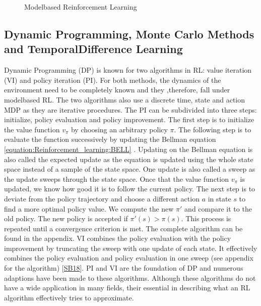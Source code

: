 \documentclass[letterpaper,10pt,english]{jupyterBook}
\let\sphinxpxdimen\pdfpxdimen\else\newdimen\sphinxpxdimen
\begin{document}
\begin{figure}[htbp]
\centering
\capstart

\noindent\sphinxincludegraphics[width=400\sphinxpxdimen,height=300\sphinxpxdimen]{{model_based_RL}.png}
\caption{Model\sphinxhyphen{}based Reinforcement Learning}\label{\detokenize{Reinforcement_learning:model-based-rl}}\end{figure}


\subsection{Dynamic Programming, Monte Carlo Methods and Temporal\sphinxhyphen{}Difference Learning}
\label{\detokenize{Reinforcement_learning:dynamic-programming-monte-carlo-methods-and-temporal-difference-learning}}
\sphinxAtStartPar
Dynamic Programming (DP) is known for two algorithms in RL: value iteration (VI) and policy iteration (PI). For both methods, the dynamics of the environment need to be completely known and they ,therefore, fall under model\sphinxhyphen{}based RL. The two algorithms also use a discrete time, state and action MDP as they are iterative procedures. The PI can be subdivided into three steps: initialize, policy evaluation and policy improvement. The first step is to initialize the value function \(v_{\pi}\) by choosing an arbitrary policy \(\pi\). The following step is to evaluate the function successively by updating the Bellman equation \eqref{equation:Reinforcement_learning:BELL}  . Updating on the Bellman equation is also called the expected update as the equation is updated using the whole state space instead of a sample of the state space. One update is also called a sweep as the update sweeps through the state space. Once that the value function \(v_{\pi}\) is updated, we know how good it is to follow the current policy. The next step is to deviate from the policy trajectory and choose a different action \(a\) in state \(s\) to find a more optimal policy value. We compute the new \(\pi '\) and compare it to the old policy. The new policy is accepted if \(\pi '(s) > \pi(s)\). This process is repeated until a convergence criterion is met. The complete algorithm can be found in the appendix. VI combines the policy evaluation with the policy improvement by truncating the sweep with one update of each state. It effectively combines the policy evaluation and policy evaluation in one sweep (see appendix for the algorithm) {[}\hyperlink{cite.Discussion:id57}{SB18}{]}. PI and VI are the foundation of DP and numerous adaptions have been made to these algorithms. Although these algorithms do not have a wide application in many fields, their essential in describing what an RL algorithm effectively tries to approximate.
\end{document}
